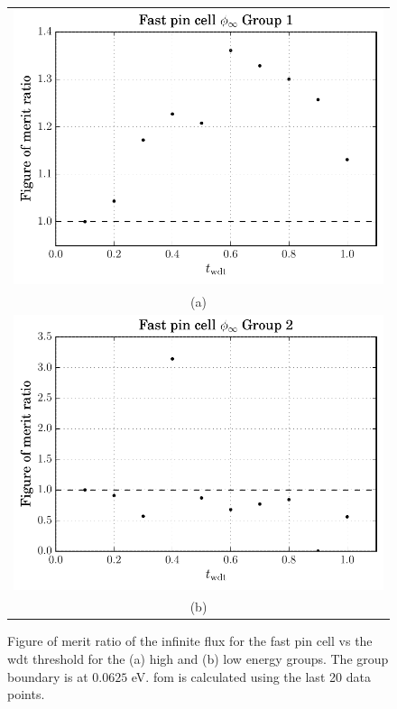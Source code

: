 \begin{figure}[hbtp]
  \centering
  \begin{tabular}{c}
  \includegraphics[scale=0.9]{images/results/fast_inf_flx_grp_1} \\
    (a) \\
  \includegraphics[scale=0.9]{images/results/fast_inf_flx_grp_2} \\
    (b) 
  \end{tabular}
  \caption[Figure of merit ratio of the infinite flux for the
  PWR]{Figure of merit ratio of the infinite flux for the fast pin cell vs the
    \gls{wdt} threshold for the (a) high and (b) low energy
    groups. The group boundary is at $0.0625$ eV. \gls{fom} is
    calculated using the last 20 data points.}
  \label{fig:fast_inf_flx}
\end{figure}
